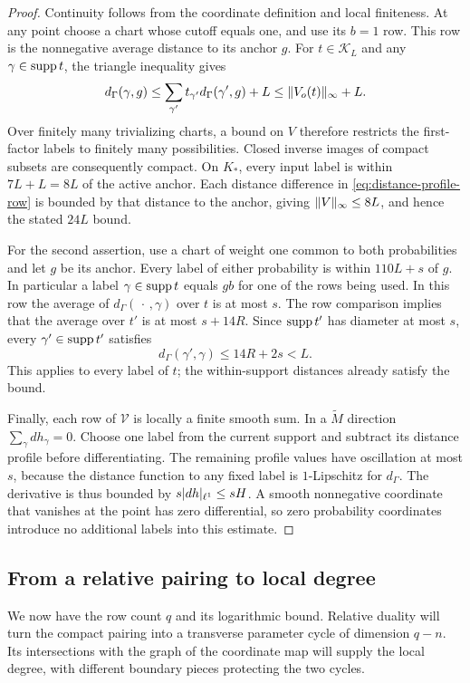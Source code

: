 \begin{proof}
Continuity follows from the coordinate definition and local finiteness.
At any point choose a chart whose cutoff equals one, and use its
$b=1$ row.  This row is the nonnegative average distance to its
anchor $g$.  For $t\in\mathcal K_L$ and any
$\gamma\in\operatorname{supp} t$, the triangle inequality gives
\[
 d_\Gamma(\gamma,g)
 \le\sum_{\gamma'}t_{\gamma'}d_\Gamma(\gamma',g)+L
 \le\lVert V_o(t)\rVert_\infty+L.
\]
Over finitely many trivializing charts, a bound on $V$ therefore
restricts the first-factor labels to finitely many possibilities.
Closed inverse images of compact subsets are consequently compact.
On $K_*$, every input label is within $7L+L=8L$ of the active anchor.
Each distance difference in \cref{eq:distance-profile-row} is bounded
by that distance to the anchor, giving
$\lVert V\rVert_\infty\le8L$, and hence the stated $24L$ bound.

For the second assertion, use a chart of weight one common to both
probabilities and let $g$ be its anchor.  Every label of either
probability is within $110L+s$ of $g$.  In particular a label
$\gamma\in\operatorname{supp} t$ equals $gb$ for one of the rows being used.
In this row the average of $d_\Gamma(\,\cdot\,,\gamma)$ over $t$
is at most $s$.  The row comparison implies that the average over
$t'$ is at most $s+14R$.  Since $\operatorname{supp} t'$ has diameter at most $s$,
every $\gamma'\in\operatorname{supp} t'$ satisfies
\[
 d_\Gamma(\gamma',\gamma)\le14R+2s<L.
\]
This applies to every label of $t$; the within-support distances
already satisfy the bound.

Finally, each row of $\mathcal V$ is locally a finite smooth sum.
In a $\widetilde M$ direction $\sum_\gamma dh_\gamma=0$.  Choose one
label from the current support and subtract its distance profile
before differentiating.  The remaining profile values have
oscillation at most $s$, because the distance function to any fixed
label is $1$-Lipschitz for $d_\Gamma$.  The derivative is thus bounded
by $s\lvert dh\rvert_{\ell^1}\le sH$.  A smooth nonnegative coordinate that
vanishes at the point has zero differential, so zero probability
coordinates introduce no additional labels into this estimate.
\end{proof}

\subsection{From a relative pairing to local degree}

We now have the row count $q$ and its logarithmic bound. Relative duality
will turn the compact pairing into a transverse parameter cycle of
dimension $q-n$. Its intersections with the graph of the coordinate map
will supply the local degree, with different boundary pieces protecting
the two cycles.

